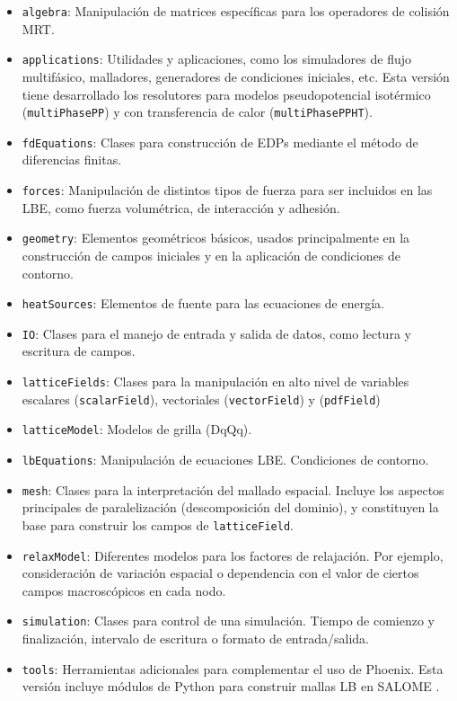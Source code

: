 \begin{itemize}
	\item \texttt{algebra}: Manipulaci\'on de matrices espec\'ificas para los operadores de colisi\'on MRT.
	\item \texttt{applications}: Utilidades y aplicaciones, como los simuladores de flujo multif\'asico, malladores, generadores de condiciones iniciales, etc. Esta versi\'on tiene desarrollado los resolutores para modelos pseudopotencial isot\'ermico (\texttt{multiPhasePP}) y con transferencia de calor (\texttt{multiPhasePPHT}).
	\item \texttt{fdEquations}: Clases para construcci\'on de EDPs mediante el m\'etodo de diferencias finitas.
	\item \texttt{forces}: Manipulaci\'on de distintos tipos de fuerza para ser incluidos en las LBE, como fuerza volum\'etrica, de interacci\'on y adhesi\'on.
	\item \texttt{geometry}: Elementos geom\'etricos b\'asicos, usados principalmente en la construcci\'on de campos iniciales y en la aplicaci\'on de condiciones de contorno.
	\item \texttt{heatSources}: Elementos de fuente para las ecuaciones de energ\'ia.
	\item \texttt{IO}: Clases para el manejo de entrada y salida de datos, como lectura y escritura de campos.
	\item \texttt{latticeFields}: Clases para la manipulaci\'on en alto nivel de variables escalares (\texttt{scalarField}), vectoriales (\texttt{vectorField}) y \fdp{} (\texttt{pdfField})
	\item \texttt{latticeModel}: Modelos de grilla (DqQq).
	\item \texttt{lbEquations}: Manipulaci\'on de ecuaciones LBE. Condiciones de contorno.
	\item \texttt{mesh}: Clases para la interpretaci\'on del mallado espacial. Incluye los aspectos principales de paralelizaci\'on (descomposici\'on del dominio), y constituyen la base para construir los campos de \texttt{latticeField}.
	\item \texttt{relaxModel}: Diferentes modelos para los factores de relajaci\'on. Por ejemplo, consideraci\'on de variaci\'on espacial o dependencia con el valor de ciertos campos macrosc\'opicos en cada nodo.
	\item \texttt{simulation}: Clases para control de una simulaci\'on. Tiempo de comienzo y finalizaci\'on, intervalo de escritura o formato de entrada/salida.
	\item \texttt{tools}: Herramientas adicionales para complementar el uso de Phoenix. Esta versi\'on incluye m\'odulos de Python para construir mallas LB en SALOME \cite{noauthor_salome_nodate}.
\end{itemize}




